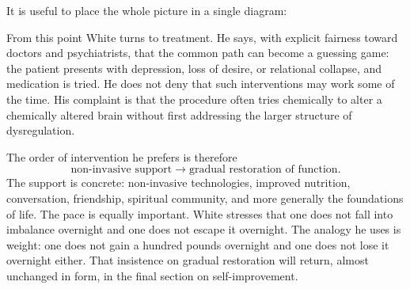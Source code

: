It is useful to place the whole picture in a single diagram:
\begin{figure}
\centering
{}
\end{figure}

From this point White turns to treatment. He says, with explicit fairness toward doctors and psychiatrists, that the common path can become a guessing game: the patient presents with depression, loss of desire, or relational collapse, and medication is tried. He does not deny that such interventions may work some of the time. His complaint is that the procedure often tries chemically to alter a chemically altered brain without first addressing the larger structure of dysregulation.

The order of intervention he prefers is therefore
\begin{equation}
\text{non-invasive support}
\to
\text{gradual restoration of function}.
\end{equation}
The support is concrete: non-invasive technologies, improved nutrition, conversation, friendship, spiritual community, and more generally the foundations of life. The pace is equally important. White stresses that one does not fall into imbalance overnight and one does not escape it overnight. The analogy he uses is weight: one does not gain a hundred pounds overnight and one does not lose it overnight either. That insistence on gradual restoration will return, almost unchanged in form, in the final section on self-improvement.

